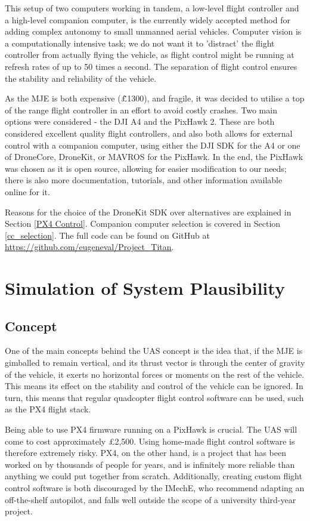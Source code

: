 \documentclass[11pt]{article}
\begin{document}
This setup of two computers working in tandem, a low-level flight controller and a high-level companion computer, is the currently widely accepted method for adding complex autonomy to small unmanned aerial vehicles\cite{student_drone_platform}. Computer vision is a computationally intensive task; we do not want it to 'distract' the flight controller from actually flying the vehicle, as flight control might be running at refresh rates of up to 50 times a second. The separation of flight control ensures the stability and reliability of the vehicle.

As the MJE is both expensive (\~\pounds1300), and fragile, it was decided to utilise a top of the range flight controller in an effort to avoid costly crashes. Two main options were considered - the DJI A4 and the PixHawk 2. These are both considered excellent quality flight controllers, and also both allows for external control with a companion computer, using either the DJI SDK for the A4 or one of DroneCore, DroneKit, or MAVROS for the PixHawk. In the end, the PixHawk was chosen as it is open source, allowing for easier modification to our needs; there is also more documentation, tutorials, and other information available online for it.

Reasons for the choice of the DroneKit SDK over alternatives are explained in Section \ref{PX4 Control}. Companion computer selection is covered in Section \ref{cc_selection}. The full code can be found on GitHub at \url{https://github.com/eugeneval/Project_Titan}.


\section{Simulation of System Plausibility} \label{simulation}
\subsection{Concept}
One of the main concepts behind the UAS concept is the idea that, if the MJE is gimballed to remain vertical, and its thrust vector is through the center of gravity of the vehicle, it exerts no horizontal forces or moments on the rest of the vehicle. This means its effect on the stability and control of the vehicle can be ignored. In turn, this means that regular quadcopter flight control software can be used, such as the PX4 flight stack.

Being able to use PX4 firmware running on a PixHawk is crucial. The UAS will come to cost approximately \pounds2,500. Using home-made flight control software is therefore extremely risky. PX4, on the other hand, is a project that has been worked on by thousands of people for years, and is infinitely more reliable than anything we could put together from scratch. Additionally, creating custom flight control software is both discouraged by the IMechE, who recommend adapting an off-the-shelf autopilot\cite{IMechE_rules}, and falls well outside the scope of a university third-year project.
\end{document}

